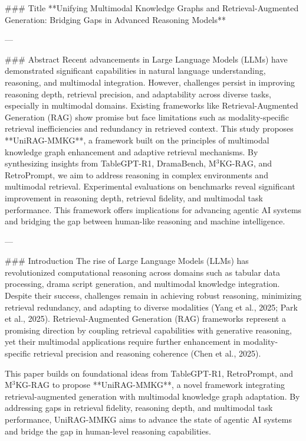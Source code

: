 ### Title  
**Unifying Multimodal Knowledge Graphs and Retrieval-Augmented Generation: Bridging Gaps in Advanced Reasoning Models**

---

### Abstract  
Recent advancements in Large Language Models (LLMs) have demonstrated significant capabilities in natural language understanding, reasoning, and multimodal integration. However, challenges persist in improving reasoning depth, retrieval precision, and adaptability across diverse tasks, especially in multimodal domains. Existing frameworks like Retrieval-Augmented Generation (RAG) show promise but face limitations such as modality-specific retrieval inefficiencies and redundancy in retrieved context. This study proposes **UniRAG-MMKG**, a framework built on the principles of multimodal knowledge graph enhancement and adaptive retrieval mechanisms. By synthesizing insights from TableGPT-R1, DramaBench, M$^3$KG-RAG, and RetroPrompt, we aim to address reasoning in complex environments and multimodal retrieval. Experimental evaluations on benchmarks reveal significant improvement in reasoning depth, retrieval fidelity, and multimodal task performance. This framework offers implications for advancing agentic AI systems and bridging the gap between human-like reasoning and machine intelligence.

---

### Introduction  
The rise of Large Language Models (LLMs) has revolutionized computational reasoning across domains such as tabular data processing, drama script generation, and multimodal knowledge integration. Despite their success, challenges remain in achieving robust reasoning, minimizing retrieval redundancy, and adapting to diverse modalities (Yang et al., 2025; Park et al., 2025). Retrieval-Augmented Generation (RAG) frameworks represent a promising direction by coupling retrieval capabilities with generative reasoning, yet their multimodal applications require further enhancement in modality-specific retrieval precision and reasoning coherence (Chen et al., 2025).

This paper builds on foundational ideas from TableGPT-R1, RetroPrompt, and M$^3$KG-RAG to propose **UniRAG-MMKG**, a novel framework integrating retrieval-augmented generation with multimodal knowledge graph adaptation. By addressing gaps in retrieval fidelity, reasoning depth, and multimodal task performance, UniRAG-MMKG aims to advance the state of agentic AI systems and bridge the gap in human-level reasoning capabilities.

